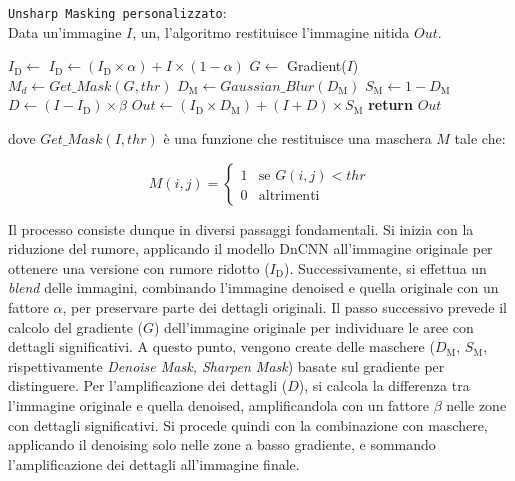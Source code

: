 \begin{algorithm} [H]
    \caption{\texttt{Unsharp Masking personalizzato}:\\ Data un'immagine $I$, un, l'algoritmo restituisce l'immagine nitida $Out$.} \label{alg:custom_unsharp}

    \begin{algorithmic}
            \State $I_{\text{D}} \gets$  
            \State $I_{\text{D}} \gets (I_{\text{D}} \times \alpha) + I \times (1-\alpha)$ 
            \State $G \gets$ Gradient($I$) 
            \State $M_{d} \gets Get\_Mask(G, thr)$ 
            \State $D_{\text{M}} \gets Gaussian\_Blur(D_{\text{M}})$ 
            \State $S_{\text{M}} \gets 1-D_{\text{M}}$ 
            \State $D \gets (I - I_{\text{D}}) \times \beta$ 
            \State $Out \gets (I_{\text{D}} \times D_{\text{M}}) + (I + D)\times S_{\text{M}}$ 
            \State \textbf{return} $Out$
        \EndFunction
    \end{algorithmic}
\end{algorithm}

dove $Get\_Mask(I, thr)$ è una funzione che restituisce una maschera $M$ tale che:

$$
M(i,j) = \begin{cases} 1 & \text{se } G(i,j) < thr \\ 0 & \text{altrimenti} \end{cases}
$$

Il processo consiste dunque in diversi passaggi fondamentali. Si inizia con la riduzione del rumore, applicando il modello DnCNN all'immagine originale per ottenere una versione con rumore ridotto ($I_{\text{D}}$).
Successivamente, si effettua un \textit{blend} delle immagini, combinando l'immagine denoised e quella originale con un fattore $\alpha$, per preservare parte dei dettagli originali.
Il passo successivo prevede il calcolo del gradiente ($G$) dell'immagine originale per individuare le aree con dettagli significativi.
A questo punto, vengono create delle maschere ($D_{\text{M}}$, $S_{\text{M}}$, rispettivamente \textit{Denoise Mask, Sharpen Mask}) basate sul gradiente per distinguere.
Per l'amplificazione dei dettagli ($D$), si calcola la differenza tra l'immagine originale e quella denoised, amplificandola con un fattore $\beta$ nelle zone con dettagli significativi.
Si procede quindi con la combinazione con maschere, applicando il denoising solo nelle zone a basso gradiente, e sommando l'amplificazione dei dettagli all'immagine finale.

